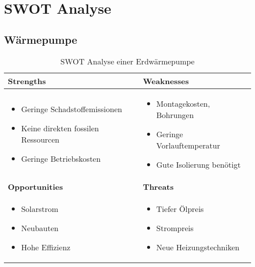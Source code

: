 \chapter{SWOT Analyse}
\label{chap:swot}

\section{Wärmepumpe}


\begin{table}[h!]
\begin{tabular}[c]{|p{}|p{}|}
  \hline
  \textbf{Strengths} &
  \textbf{Weaknesses} \\ \hline
  
  \begin{itemize}
    \item Geringe Schadstoffemissionen
    \item Keine direkten fossilen Ressourcen
    \item Geringe Betriebskosten
  \end{itemize}
  &
  
  \begin{itemize}
    \item Montagekosten, Bohrungen
    \item Geringe Vorlauftemperatur
    \item Gute Isolierung benötigt
  \end{itemize}
  \\ \hline
  
  \textbf{Opportunities} &
  \textbf{Threats} \\ \hline
  
  \begin{itemize}
    \item Solarstrom
    \item Neubauten
    \item Hohe Effizienz
  \end{itemize}
  &
  
  \begin{itemize}
    \item Tiefer Ölpreis
    \item Strompreis
    \item Neue Heizungstechniken
  \end{itemize}  
  \\ \hline
\end{tabular}
\label{swot:warmepumpe}
\caption{SWOT Analyse einer Erdwärmepumpe}
\end{table}


